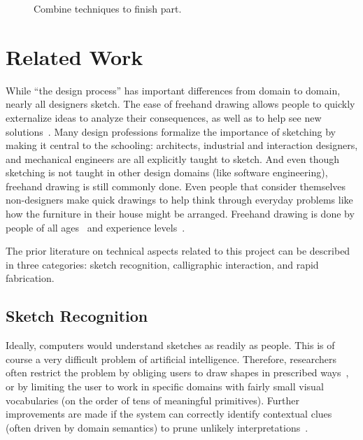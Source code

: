 \documentclass[12pt]{article}
\begin{document}
\begin{figure}[] 
\centering
{} 
\caption{Combine techniques to finish part.}
\label{fig:ix-final-steps}
\end{figure}
\restoregeometry
\newpage
\onecolumn
\doublespacing
\section{Related Work}

While ``the design process'' has important differences from domain to
domain, nearly all designers sketch. The ease of freehand drawing
allows people to quickly externalize ideas to analyze their
consequences, as well as to help see new
solutions~\cite{lawson-designers-think,goldschmidt-dialectics}. Many
design professions formalize the importance of sketching by making it
central to the schooling: architects, industrial and interaction
designers, and mechanical engineers are all explicitly taught to
sketch. And even though sketching is not taught in other design
domains (like software engineering), freehand drawing is still
commonly done. Even people that consider themselves non-designers make
quick drawings to help think through everyday problems like how the
furniture in their house might be arranged. Freehand drawing is done
by people of all ages~\cite{goldschmidt-backtalk} and experience
levels~\cite{suwa-analysis-students}.

The prior literature on technical aspects related to this project can
be described in three categories: sketch recognition, calligraphic
interaction, and rapid fabrication.

\subsection{Sketch Recognition}

Ideally, computers would understand sketches as readily as
people. This is of course a very difficult problem of artificial
intelligence. Therefore, researchers often restrict the problem by
obliging users to draw shapes in prescribed
ways~\cite{rubine-recognizer,wobbrock-dollar}, or by limiting the user
to work in specific domains with fairly small visual vocabularies (on
the order of tens of meaningful primitives). Further improvements are
made if the system can correctly identify contextual clues (often
driven by domain semantics) to prune unlikely
interpretations~\cite{gross-ecn-uist,do-phd-thesis}.
\end{document}
